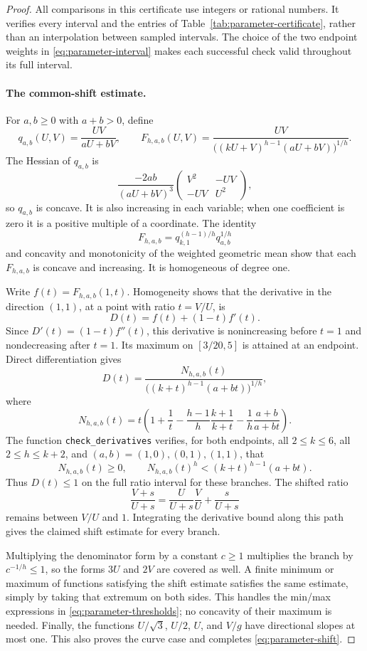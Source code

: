 \begin{proof}
All comparisons in this certificate use integers or rational numbers.
It verifies every interval and the entries of
Table~\ref{tab:parameter-certificate}, rather than an interpolation
between sampled intervals.  The choice of the two endpoint weights
in \eqref{eq:parameter-interval} makes each successful check valid
throughout its full interval.

\paragraph{The common-shift estimate.}
For $a,b\ge0$ with $a+b>0$, define
\[
 q_{a,b}(U,V)=\frac{UV}{aU+bV},\qquad
 F_{h,a,b}(U,V)=\frac{UV}
 {\bigl((kU+V)^{h-1}(aU+bV)\bigr)^{1/h}}.
\]
The Hessian of $q_{a,b}$ is
\[
 \frac{-2ab}{(aU+bV)^3}
 \begin{pmatrix}V^2&-UV\\-UV&U^2\end{pmatrix},
\]
so $q_{a,b}$ is concave.  It is also increasing in each variable;
when one coefficient is zero it is a positive multiple of a
coordinate.  The identity
\[
 F_{h,a,b}=q_{k,1}^{(h-1)/h}q_{a,b}^{1/h}
\]
and concavity and monotonicity of the weighted geometric mean show
that each $F_{h,a,b}$ is concave and increasing.  It is homogeneous
of degree one.

Write $f(t)=F_{h,a,b}(1,t)$.  Homogeneity shows that the derivative
in the direction $(1,1)$, at a point with ratio $t=V/U$, is
\[
 D(t)=f(t)+(1-t)f'(t).
\]
Since $D'(t)=(1-t)f''(t)$, this derivative is nonincreasing before
$t=1$ and nondecreasing after $t=1$.  Its maximum on $[3/20,5]$
is attained at an endpoint.  Direct differentiation gives
\[
 D(t)=\frac{N_{h,a,b}(t)}
 {\bigl((k+t)^{h-1}(a+bt)\bigr)^{1/h}},
\]
where
\[
 N_{h,a,b}(t)=t\left(1+\frac1t
 -\frac{h-1}{h}\frac{k+1}{k+t}
 -\frac1h\frac{a+b}{a+bt}\right).
\]
The function \texttt{check\_derivatives} verifies, for both endpoints,
all $2\le k\le6$, all $2\le h\le k+2$, and
$(a,b)=(1,0),(0,1),(1,1)$, that
\[
 N_{h,a,b}(t)\ge0,\qquad
 N_{h,a,b}(t)^h<(k+t)^{h-1}(a+bt).
\]
Thus $D(t)\le1$ on the full ratio interval for these branches.
The shifted ratio
\[
 \frac{V+s}{U+s}
 =\frac U{U+s}\frac VU+\frac s{U+s}
\]
remains between $V/U$ and $1$.  Integrating the derivative bound
along this path gives the claimed shift estimate for every branch.

Multiplying the denominator form by a constant $c\ge1$ multiplies
the branch by $c^{-1/h}\le1$, so the forms $3U$ and $2V$ are
covered as well.  A finite minimum or maximum of functions satisfying
the shift estimate satisfies the same estimate, simply by taking
that extremum on both sides.  This handles the min/max expressions
in \eqref{eq:parameter-thresholds}; no concavity of their maximum
is needed.  Finally, the functions $U/\sqrt3$, $U/2$, $U$, and
$V/g$ have directional slopes at most one.  This also proves the
curve case and completes \eqref{eq:parameter-shift}.
\end{proof}

